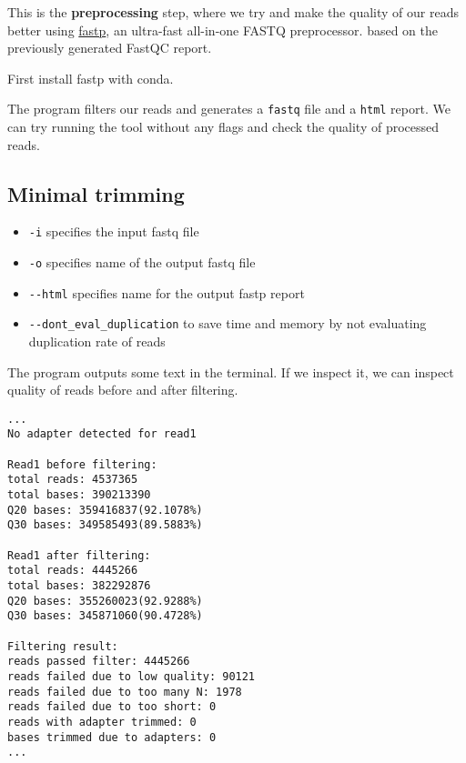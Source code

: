 This is the \textbf{preprocessing} step, where we try and make the
quality of our reads better using
\href{https://github.com/OpenGene/fastp}{fastp}, an ultra-fast
all-in-one FASTQ preprocessor. based on the previously generated FastQC
report.

First install fastp with conda.

\begin{Shaded}
\begin{Highlighting}[]
\end{Highlighting}
\end{Shaded}

The program filters our reads and generates a \texttt{fastq} file and a
\texttt{html} report. We can try running the tool without any flags and
check the quality of processed reads.

\hypertarget{minimal-trimming}{%
\subsection{Minimal trimming}\label{minimal-trimming}}

\begin{Shaded}
\begin{Highlighting}[]
 
\end{Highlighting}
\end{Shaded}

\begin{itemize}
\tightlist
\item
  \texttt{-i} specifies the input fastq file
\item
  \texttt{-o} specifies name of the output fastq file
\item
  \texttt{-\/-html} specifies name for the output fastp report
\item
  \texttt{-\/-dont\_eval\_duplication} to save time and memory by not
  evaluating duplication rate of reads
\end{itemize}

The program outputs some text in the terminal. If we inspect it, we can
inspect quality of reads before and after filtering.

\begin{verbatim}
...
No adapter detected for read1

Read1 before filtering:
total reads: 4537365
total bases: 390213390
Q20 bases: 359416837(92.1078%)
Q30 bases: 349585493(89.5883%)

Read1 after filtering:
total reads: 4445266
total bases: 382292876
Q20 bases: 355260023(92.9288%)
Q30 bases: 345871060(90.4728%)

Filtering result:
reads passed filter: 4445266
reads failed due to low quality: 90121
reads failed due to too many N: 1978
reads failed due to too short: 0
reads with adapter trimmed: 0
bases trimmed due to adapters: 0
...
\end{verbatim}

